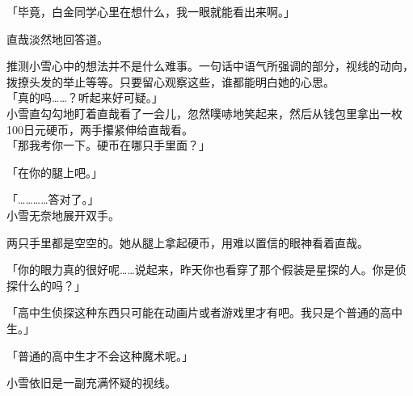 「毕竟，白金同学心里在想什么，我一眼就能看出来啊。」

直哉淡然地回答道。

推测小雪心中的想法并不是什么难事。一句话中语气所强调的部分，视线的动向，拨撩头发的举止等等。只要留心观察这些，谁都能明白她的心思。\\

「真的吗……？听起来好可疑。」\\

小雪直勾勾地盯着直哉看了一会儿，忽然噗哧地笑起来，然后从钱包里拿出一枚100日元硬币，两手攥紧伸给直哉看。\\

「那我考你一下。硬币在哪只手里面？」

「在你的腿上吧。」

「…………答对了。」\\

小雪无奈地展开双手。

两只手里都是空空的。她从腿上拿起硬币，用难以置信的眼神看着直哉。

「你的眼力真的很好呢……说起来，昨天你也看穿了那个假装是星探的人。你是侦探什么的吗？」

「高中生侦探这种东西只可能在动画片或者游戏里才有吧。我只是个普通的高中生。」

「普通的高中生才不会这种魔术呢。」

小雪依旧是一副充满怀疑的视线。

